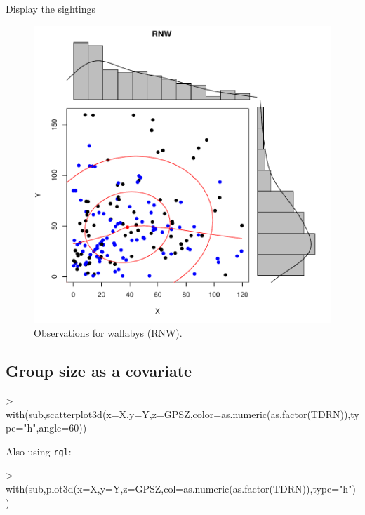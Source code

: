 \documentclass{article}
\begin{document}
Display the sightings
\begin{figure}
\begin{center}
\includegraphics{WC86R1-fig2}
\end{center}
\caption{Observations for wallabys (RNW).}
\label{fig:two}
\end{figure}

\subsection{Group size as a covariate}
\begin{Schunk}
\begin{Sinput}
> with(sub,scatterplot3d(x=X,y=Y,z=GPSZ,color=as.numeric(as.factor(TDRN)),type="h",angle=60))
\end{Sinput}
\end{Schunk}

Also using \texttt{rgl}:
\begin{Schunk}
\begin{Sinput}
> with(sub,plot3d(x=X,y=Y,z=GPSZ,col=as.numeric(as.factor(TDRN)),type="h"))
\end{Sinput}
\end{Schunk}
\end{document}
